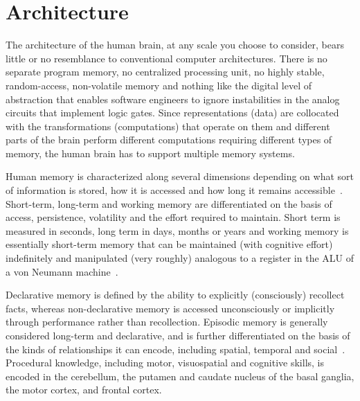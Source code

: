 \documentclass[letterpaper,11pt]{article}
\def\footnote#1{{}}
\def\urlh#1{{}}
\def\etal{{\em{et al}}}
\begin{document}





\section{Architecture}
\label{section_architecture}

The architecture of the human brain, at any scale you choose to consider, bears little or no resemblance to conventional computer architectures. There is no separate program memory, no centralized processing unit, no highly stable, random-access, non-volatile memory and nothing like the digital level of abstraction that enables software engineers to ignore instabilities in the analog circuits that implement logic gates. Since representations (data) are collocated with the transformations (computations) that operate on them and different parts of the brain perform different computations requiring different types of memory, the human brain has to support multiple memory systems.

Human memory\footnote{%
%  
  For students looking for an introduction to memory systems in the brain, you might start with Chapter~24 in~\cite{Bearetal2015} if you own or have access to either the 3rd or 4th edition, or, for a more succinct overview, try Rolls~\cite{RollsARP-01}, Raslau~\etal{}~\cite{RaslauetalAJN-15,RaslauetalAJN-15}, or, most expedient, Wikipedia ({\urlh{https://en.wikipedia.org/wiki/Neuroanatomy_of_memory}{URL}}).} 
%
is characterized along several dimensions depending on what sort of information is stored, how it is accessed and how long it remains accessible~\cite{CowanPBR-08}. Short-term, long-term and working memory are differentiated on the basis of access, persistence, volatility and the effort required to maintain. Short term is measured in seconds, long term in days, months or years and working memory is essentially short-term memory that can be maintained (with cognitive effort) indefinitely and manipulated (very roughly) analogous to a register in the ALU of a von Neumann machine~\cite{BaddeleyQJoEP-86}.

Declarative memory is defined by the ability to explicitly (consciously) recollect facts, whereas non-declarative memory is accessed unconsciously or implicitly through performance rather than recollection. Episodic memory is generally considered long-term and declarative, and is further differentiated on the basis of the kinds of relationships it can encode, including spatial, temporal and social~\cite{StachenfeldetalNATURE-17,RueckemannandBuffaloNATURE-2017,KumaranandMaguireJoN-05,NealandEichenbaum1993}. Procedural knowledge, including motor, visuospatial and cognitive skills, is encoded in the cerebellum, the putamen and caudate nucleus of the basal ganglia, the motor cortex, and frontal cortex.
\end{document}
